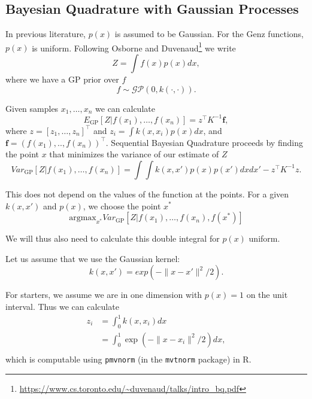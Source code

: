 \subsection*{Bayesian Quadrature with Gaussian Processes}
In previous literature, $p(x)$ is assumed to be Gaussian. For the Genz functions, $p(x)$ is uniform. Following Osborne \cite{GPSQ} and Duvenaud\footnote{\url{https://www.cs.toronto.edu/~duvenaud/talks/intro\_bq.pdf}} we write
\begin{equation}
    Z = \int f(x) p(x) dx,
\label{eqn:BQwithGP}
\end{equation}
where we have a GP prior over $f$
\begin{equation}
    f \sim \mathcal{GP}(0,k(\cdot,\cdot)).
\end{equation}
    
Given samples $x_1, \ldots, x_n$ we can calculate \cite{Rasmussen:2005:GPM:1162254}
\begin{equation}
    E_{\mbox{GP}}\left[Z | f(x_1), \ldots, f(x_n)\right] = z^{\top} K^{-1}\pmb{f},
\end{equation}
where $z = [z_1, \ldots, z_n]^{\top}$ and $z_i = \int k(x,x_i)p(x)dx$, and $\pmb{f} = (f(x_1),..,f(x_n))^{\top}$. 
Sequential Bayesian Quadrature proceeds by finding the point $x$ that minimizes the variance of our estimate of $Z$
\begin{equation}
    Var_{\mbox{GP}}\left[Z | f(x_1), \ldots, f(x_n)\right] = \int \int k(x,x')p(x)p(x')dxdx' - z^{\top}K^{-1}z. 
\end{equation}

This does not depend on the values of the function at the points. For a given $k(x,x')$ and $p(x)$, we choose the point $x^*$
\begin{equation}
    \mbox{argmax}_{x^*} Var_{\mbox{GP}}\left[Z | f(x_1), \ldots, f(x_n), f(x^*) \right] 
\end{equation}

We will thus also need to calculate this double integral for $p(x)$ uniform.

Let us assume that we use the Gaussian kernel:
\begin{equation}
    k(x,x') = exp(-\|x-x'\|^2/2).
\end{equation}

For starters, we assume we are in one dimension with $p(x) = 1$ on the unit interval.
Thus we can calculate
\begin{align}
    z_i & = \int_{0}^1 k(x,x_i) dx \\
    & = \int_0^1 \exp(-\|x-x_i\|^2/2) dx, \\
\end{align}
which is computable using \texttt{pmvnorm} (in the \texttt{mvtnorm} package) in R.

